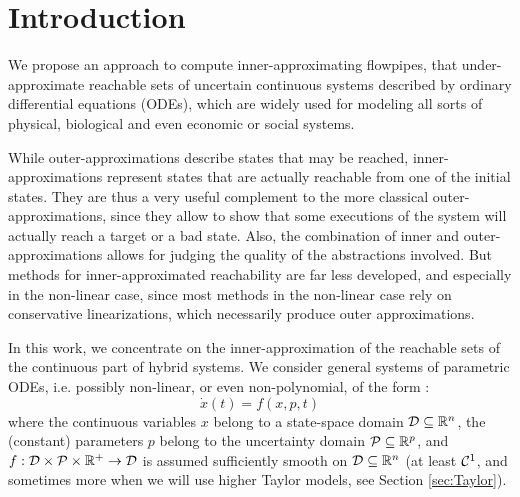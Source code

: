 \documentclass{sig-alternate-05-2015}
\def\R{{\mathbb R}}
\begin{document}


%
%

%
%





\section{Introduction}

We propose an approach to compute inner-approxi\-mating flowpipes, that under-approximate reachable sets 
of uncertain continuous systems described by ordinary differential equations (ODEs), which 
are widely used for modeling all sorts of physical, biological and even economic or
social systems.  

While outer-approximations describe states that may be rea\-ched, inner-approximations represent
states that are actually reachable from one of the initial states. They are
thus a very useful complement to the more classical outer-approxima\-tions, since they allow to show
that some executions of the system will actually reach a target or a bad state. Also, the combination of
inner and outer-approximations allows for judging the quality of the abstractions involved. 
But methods for inner-approximated reachability are far less developed, and especially in the non-linear case, 
since most methods in the non-linear case rely on conservative linearizations, which necessarily produce outer approximations.

In this work, we concentrate on the inner-approximation of the reachable sets of
the continuous part of hybrid systems. %
We consider general systems of parametric ODEs, i.e. possibly non-linear, or
even non-polyno\-mial, of the form : 
\begin{equation}
\dot{x}(t) = f(x,p,t)
\label{eq:flow}
\end{equation}
\noindent where the continuous variables $x$ belong to a state-space domain 
${\cal D} \subseteq \R^n$, the (constant) parameters $p$ belong to the uncertainty domain
${\cal P} \subseteq \R^p$, and 
$f: {\cal D} \times {\cal P} \times \R^+ \rightarrow {\cal D}$ is assumed sufficiently smooth 
on ${\cal D} \subseteq \R^n$ (at least ${\cal C}^1$, and sometimes more when we will use higher
Taylor models, see Section \ref{sec:Taylor}).
\end{document}
